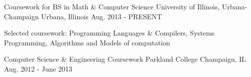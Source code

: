 \begin{cventries}
  \cventry
    {Coursework for BS in Math \& Computer Science}
    {University of Illinois, Urbana-Champaign}
    {Urbana, Illinois}
    {Aug. 2013 - PRESENT}
    {
      \begin{cvitems}
        \item Selected coursework: Programming Languages \& Compilers, Systems Programming, Algorithms and Models of computation
      \end{cvitems}
    }
    \cventry
    {Computer Science \& Engineering Coursework}
    {Parkland College}
    {Champaign, IL}
    {Aug. 2012 - June 2013}
    {}
\end{cventries}
